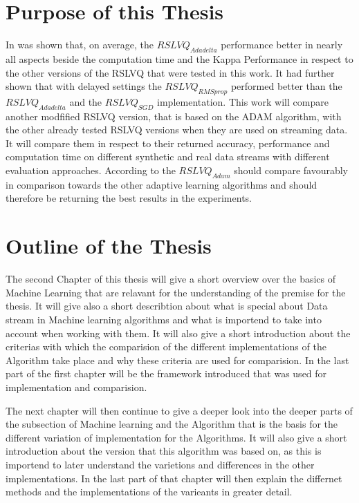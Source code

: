\documentclass[12pt,oneside,a4paper,parskip]{scrbook}
\begin{document}
\section{Purpose of this Thesis} 
In \cite{PassiveDriftonRSLVQ} was shown that, on average, the $RSLVQ_\textit{Adadelta}$ performance better in nearly
all aspects beside the computation time and the Kappa Performance in respect to the other versions of the RSLVQ 
that were tested in this work.
It had further shown that with delayed settings the $RSLVQ_\textit{RMSprop}$ performed better than the $RSLVQ_\textit{Adadelta}$
and the $RSLVQ_\textit{SGD}$ implementation.
This work will compare another modfified RSLVQ version, that is based on the ADAM algorithm, with the other already tested
RSLVQ versions when they are used on streaming data. It will compare them in respect to their returned accuracy,
performance and computation time on different synthetic and real data streams with different evaluation approaches.
According to \cite{Kingma2014AdamAM} the $RSLVQ_\textit{Adam}$ should compare favourably in comparison towards the
other adaptive learning algorithms and should therefore be returning the best results in the experiments.


\section{Outline of the Thesis} 

The second Chapter of this thesis will give a short overview over the basics of Machine Learning that are relavant for
the understanding of the premise for the thesis. It will give also a short describtion about what is special about Data stream 
in Machine learning algorithms and what is importend to take into account when working with them.
It will also give a short introduction about the criterias with which the comparision of the different implementations 
of the Algorithm take place and why these criteria are used for  comparision.
In the last part of the first chapter will be the framework introduced that was used for implementation and comparision.

The next chapter will then continue to give a deeper look into the deeper parts of the subsection of Machine learning 
and the Algorithm that is the basis for the different variation of implementation for the Algorithms.
It will also give a short introduction about the version that this algorithm was based on, as this is importend to later understand
the varietions and differences in the other implementations.
In the last part of that chapter will then explain the differnet methods and the implementations of the varieants in greater detail.
\end{document}
